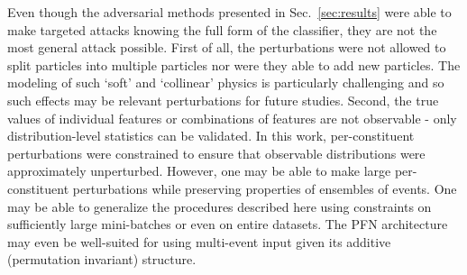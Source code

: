 \documentclass[reprint,nofootinbib,...]{revtex4-1}
\begin{document}
Even though the adversarial methods presented in Sec.~\ref{sec:results} were able to make targeted attacks knowing the full form of the classifier, they are not the most general attack possible.  First of all, the perturbations were not allowed to split particles into multiple particles nor were they able to add new particles.  The modeling of such `soft' and `collinear' physics is particularly challenging and so such effects may be relevant perturbations for future studies.  Second, the true values of individual features or combinations of features are not observable - only distribution-level statistics can be validated.  In this work, per-constituent perturbations were constrained to ensure that observable distributions were approximately unperturbed.  However, one may be able to make large per-constituent perturbations while preserving properties of ensembles of events.  One may be able to generalize the procedures described here using constraints on sufficiently large mini-batches or even on entire datasets.  The PFN architecture may even be well-suited for using multi-event input given its additive (permutation invariant) structure. 






\end{document}
